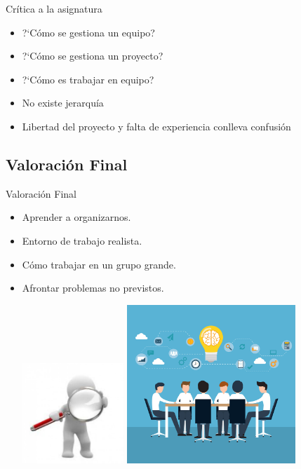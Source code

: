 \documentclass{beamer}
\begin{document}
\begin{frame}{Cr\'itica a la asignatura}
  \begin{itemize}
  \item { ?`C\'omo se gestiona un equipo?}
  \item { ?`C\'omo se gestiona un proyecto?}
  \item {?`C\'omo es trabajar en equipo?}
  \end{itemize}
  
    \begin{itemize}
    \item {No existe jerarqu\'ia}
    \item {Libertad del proyecto y falta de experiencia conlleva confusi\'on}
    \end{itemize}
    
\end{frame}

\subsection{Valoraci\'on Final}

\begin{frame}{Valoraci\'on Final}
	\begin{itemize}
 	 \item {
  		Aprender a organizarnos.
 	 }
 	 \item {
  		Entorno de trabajo realista.
 	 }
 	 \item {
		C\'omo trabajar en un grupo grande.
 	 }
 	 \item {
  		Afrontar problemas no previstos.
 	 }
 	 
	\includegraphics[width=0.3\textwidth, height=0.5\textheight]{images_latex/valoracion}
		\includegraphics[width=0.5\textwidth, height=0.45\textheight]{images_latex/trabajoequipo}
  \end{itemize}
\end{frame}
\end{document}
